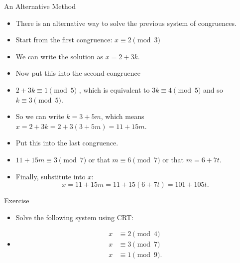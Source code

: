 \documentclass[ %
 usenames,dvipsnames,
aspectratio=169,11pt ]{beamer}
\newenvironment{stepitemize}{\begin{itemize}[<+->]}{\end{itemize} }
\begin{document}
\begin{frame}{An Alternative Method}
\begin{stepitemize}

\item There is an alternative way to solve the previous system of congruences.
\item Start from the first congruence: $x\equiv 2\pmod{3}$
\item We can write the solution as $x=2+3k$.
\item Now put this into the second congruence
\item $2+3k\equiv 1 \pmod{5}$ , which is equivalent to $3k\equiv 4 \pmod{5}$ and so $k\equiv 3 \pmod{5}$.
\item So we can write $k=3+5m$, which means $x=2+3k=2+3(3+5m)=11+15m$.
\item Put this into the last congruence.
\item $11+15m\equiv 3 \pmod{7}$ or that $m\equiv 6 \pmod{7}$ or that $m=6+7t$.
\item Finally, substitute into $x$:
$$x=11+15m=11+15(6+7t)=101+105t.$$
\end{stepitemize}

\end{frame}

\begin{frame}{Exercise}
\begin{stepitemize}
\item Solve the following system using CRT:
\item \begin{align*}
    x &\equiv 2 \pmod{4} \\
    x &\equiv 3 \pmod{7} \\
    x &\equiv 1 \pmod{9}.
    \end{align*}
\end{stepitemize}

\end{frame}
\end{document}

